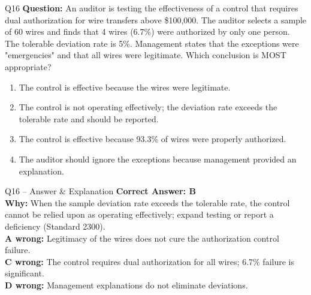 \documentclass[aspectratio=169,10pt]{beamer}
\begin{document}
	\begin{frame}[t]{Q16}
		\small
		\textbf{Question:} An auditor is testing the effectiveness of a control that requires dual authorization for wire transfers above \$100,000. The auditor selects a sample of 60 wires and finds that 4 wires (6.7\%) were authorized by only one person. The tolerable deviation rate is 5\%. Management states that the exceptions were "emergencies" and that all wires were legitimate. Which conclusion is MOST appropriate?
		\begin{enumerate}[label=\Alph*.,itemsep=1pt,topsep=2pt]
			\item The control is effective because the wires were legitimate.
			\item The control is not operating effectively; the deviation rate exceeds the tolerable rate and should be reported.
			\item The control is effective because 93.3\% of wires were properly authorized.
			\item The auditor should ignore the exceptions because management provided an explanation.
		\end{enumerate}
	\end{frame}
	
	\begin{frame}[t]{Q16 -- Answer \& Explanation}
		\small
		\textbf{Correct Answer: B} \\[4pt]
		\textbf{Why:} When the sample deviation rate exceeds the tolerable rate, the control cannot be relied upon as operating effectively; expand testing or report a deficiency (Standard 2300). \\[4pt]
		\textbf{A wrong:} Legitimacy of the wires does not cure the authorization control failure. \\[2pt]
		\textbf{C wrong:} The control requires dual authorization for all wires; 6.7\% failure is significant. \\[2pt]
		\textbf{D wrong:} Management explanations do not eliminate deviations.
	\end{frame}
	
\end{document}
